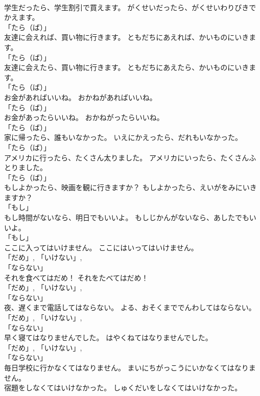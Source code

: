 \documentclass[8pt]{extreport}
\begin{document}
\begin{CJK}{UTF8}{min}
\\	学生だったら、学生割引で買えます。	がくせいだったら、がくせいわりびきでかえます。	
\\	「たら（ば）」	
\\	友達に会えれば、買い物に行きます。	ともだちにあえれば、かいものにいきます。	
\\	「たら（ば）」	
\\	友達に会えたら、買い物に行きます。	ともだちにあえたら、かいものにいきます。	
\\	「たら（ば）」	
\\	お金があればいいね。	おかねがあればいいね。	
\\	「たら（ば）」	
\\	お金があったらいいね。	おかねがったらいいね。	
\\	「たら（ば）」	
\\	家に帰ったら、誰もいなかった。	いえにかえったら、だれもいなかった。	
\\	「たら（ば）」	
\\	アメリカに行ったら、たくさん太りました。	アメリカにいったら、たくさんふとりました。	
\\	「たら（ば）」	
\\	もしよかったら、映画を観に行きますか？	もしよかったら、えいがをみにいきますか？	
\\	「もし」 
\\	もし時間がないなら、明日でもいいよ。	もしじかんがないなら、あしたでもいいよ。	
\\	「もし」 
\\	ここに入ってはいけません。	ここにはいってはいけません。	
\\	「だめ」, 「いけない」, 
\\	「ならない」 
\\	それを食べてはだめ！	それをたべてはだめ！	
\\	「だめ」, 「いけない」, 
\\	「ならない」 
\\	夜、遅くまで電話してはならない。	よる、おそくまででんわしてはならない。	
\\	「だめ」, 「いけない」, 
\\	「ならない」 
\\	早く寝てはなりませんでした。	はやくねてはなりませんでした。	
\\	「だめ」, 「いけない」, 
\\	「ならない」 
\\	毎日学校に行かなくてはなりません。	まいにちがっこうにいかなくてはなりません。	
\\	宿題をしなくてはいけなかった。	しゅくだいをしなくてはいけなかった。	

\end{CJK}
\end{document}

